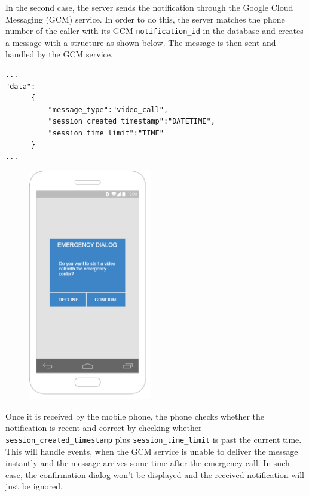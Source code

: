 \documentclass{article}
\begin{document}
In the second case, the server sends the notification through the Google Cloud Messaging (GCM) service. In order to do this, the server matches the phone number of the caller with its GCM \texttt{\color{OliveGreen}notification\_id} in the database and creates a message with a structure as shown below. The message is then sent and handled by the GCM service.

\pagebreak
\begin{lstlisting}
...
"data":
      {
          "message_type":"video_call",
          "session_created_timestamp":"DATETIME",
          "session_time_limit":"TIME"
      }
...

\end{lstlisting}

\begin{figure}
\vspace{-20pt}
  \begin{center}
    \includegraphics[width=0.48\textwidth]{"EmergencyAppIteration1/emergencydialog"}
  \end{center}
\vspace{-110pt}
\end{figure}
Once it is received by the mobile phone, the phone checks whether the notification is recent and correct by checking whether \texttt{\color{OliveGreen}session\_created\_timestamp} plus \texttt{\color{OliveGreen}session\_time\_limit} is past the current time. This will handle events, when the GCM service is unable to deliver the message instantly and the message arrives some time after the emergency call. In such case, the confirmation dialog won’t be displayed and the received notification will just be ignored.\\
\end{document}
